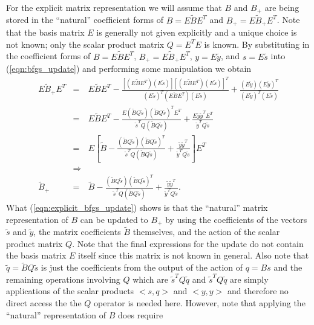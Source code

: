 For the explicit matrix representation we will assume that $B$ and $B_+$ are
being stored in the ``natural'' coefficient forms of $B = E {}\tilde{B} E^T$
and $B_+ = E {}\tilde{B}_+ E^T$.  Note that the basis matrix $E$ is generally
not given explicitly and a unique choice is not known; only the scalar product
matrix $Q = E^T E$ is known.  By substituting in the coefficient forms of $B =
E {}\tilde{B} E^T$, $B_+ = E {}\tilde{B}_+ E^T$, $y = E {}\tilde{y}$, and $s =
E {}\tilde{s}$ into (\ref{eqn:bfgs_update}) and performing some manipulation
we obtain
%
\begin{eqnarray}
E \tilde{B}_+ E^T
& = & E \tilde{B} E^T
  - \frac{[(E \tilde{B} E^T)(E \tilde{s})][(E \tilde{B} E^T)(E \tilde{s})]^T}{(E \tilde{s})^T(E \tilde{B} E^T)(E \tilde{s})}
  + \frac{(E \tilde{y})(E \tilde{y})^T}{(E \tilde{y})^T (E \tilde{s})} \nonumber \\
& = & E \tilde{B} E^T
  - \frac{E(\tilde{B} Q \tilde{s})(\tilde{B} Q \tilde{s})^T E^T}{\tilde{s}^T Q (\tilde{B} Q \tilde{s})}
  + \frac{E \tilde{y} \tilde{y}^T E^T}{\tilde{y}^T Q \tilde{s}} \nonumber \\
& = & E \left[
  \tilde{B}
  - \frac{(\tilde{B} Q \tilde{s})(\tilde{B} Q \tilde{s})^T}{\tilde{s}^T Q (\tilde{B} Q \tilde{s})}
  + \frac{\tilde{y} \tilde{y}^T}{\tilde{y}^T Q \tilde{s}}
  \right] E^T \nonumber \\
& \Rightarrow & \nonumber \\
\tilde{B}_+
& = & \tilde{B}
  - \frac{(\tilde{B} Q \tilde{s})(\tilde{B} Q \tilde{s})^T}{\tilde{s}^T Q (\tilde{B} Q \tilde{s})}
  + \frac{\tilde{y} \tilde{y}^T}{\tilde{y}^T Q \tilde{s}}.
\label{eqn:explicit_bfgs_update}
\end{eqnarray}
%
What (\ref{eqn:explicit_bfgs_update}) shows is that the ``natural'' matrix
representation of $B$ can be updated to $B_+$ by using the coefficients of the
vectors $\tilde{s}$ and $\tilde{y}$, the matrix coefficients $\tilde{B}$
themselves, and the action of the scalar product matrix $Q$.  Note that the
final expressions for the update do not contain the basis matrix $E$ itself
since this matrix is not known in general.  Also note that $\tilde{q} =
{}\tilde{B}Q\tilde{s}$ is just the coefficients from the output of the action
of $q = B s$ and the remaining operations involving $Q$ which are $\tilde{s}^T
Q\tilde{q}$ and $\tilde{s}^T Q\tilde{q}$ are simply applications of the scalar
products $<s,q>$ and $<y,y>$ and therefore no direct access the the $Q$
operator is needed here.  However, note that applying the ``natural''
representation of $B$ does require

